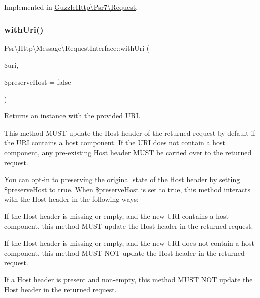 Implemented in \hyperlink{classGuzzleHttp_1_1Psr7_1_1Request_aa05ac6946c5b3f50b5b136142ccf193f}{Guzzle\+Http\textbackslash{}\+Psr7\textbackslash{}\+Request}.

\mbox{\label{interfacePsr_1_1Http_1_1Message_1_1RequestInterface_a17c5215ee9c9cf32304834d9093d3291}} 
\subsubsection{\texorpdfstring{with\+Uri()}{withUri()}}
{\footnotesize\ttfamily Psr\textbackslash{}\+Http\textbackslash{}\+Message\textbackslash{}\+Request\+Interface\+::with\+Uri (\begin{DoxyParamCaption}\item[{\hyperlink{interfacePsr_1_1Http_1_1Message_1_1UriInterface}{Uri\+Interface}}]{\$uri,  }\item[{}]{\$preserve\+Host = {\ttfamily false} }\end{DoxyParamCaption})}

Returns an instance with the provided U\+RI.

This method M\+U\+ST update the Host header of the returned request by default if the U\+RI contains a host component. If the U\+RI does not contain a host component, any pre-\/existing Host header M\+U\+ST be carried over to the returned request.

You can opt-\/in to preserving the original state of the Host header by setting {\ttfamily \$preserve\+Host} to {\ttfamily true}. When {\ttfamily \$preserve\+Host} is set to {\ttfamily true}, this method interacts with the Host header in the following ways\+:


\begin{DoxyItemize}
\item If the Host header is missing or empty, and the new U\+RI contains a host component, this method M\+U\+ST update the Host header in the returned request.
\item If the Host header is missing or empty, and the new U\+RI does not contain a host component, this method M\+U\+ST N\+OT update the Host header in the returned request.
\item If a Host header is present and non-\/empty, this method M\+U\+ST N\+OT update the Host header in the returned request.
\end{DoxyItemize}

